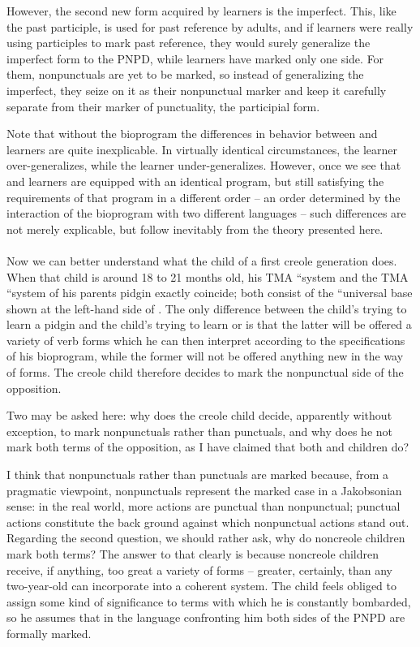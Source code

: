 However, the second new form acquired by  learners is the imperfect. This, like the past participle, is used for past reference by adults, and if  learners were really using participles to mark past reference, they would surely generalize the imperfect form to
the PNPD, while  learners have marked only one side. For them, nonpunctuals are yet to be marked, so instead of generalizing the imperfect, they seize on it as their nonpunctual marker and keep it carefully separate from their marker of punctuality, the participial form.

Note that without the bioprogram the differences in behavior between  and  learners are quite inexplicable. In virtually identical circumstances, the  learner over-generalizes, while the  learner under-generalizes. However, once we see that  and  learners are equipped with an identical program, but still satisfying the requirements of that program in a different order -- an order determined by the interaction of the bioprogram with two different languages -- such differences are not merely explicable, but follow inevitably from the theory presented here.\\\\

Now we can better understand what the child of a first creole generation does. When that child is around 18 to 21 months old, his TMA ``system and the TMA ``system of his parents pidgin exactly coincide; both consist of the ``universal base shown at the left-hand side of . The only difference between the child's trying to learn a pidgin and the child's trying to learn  or  is that the latter will be offered a variety of verb forms which he can then interpret according to the specifications of his bioprogram, while the former will not be offered anything new in the way of forms. The creole child therefore decides to mark the nonpunctual side of the opposition.

Two  may be asked here: why does the creole child decide, apparently without exception, to mark nonpunctuals rather than punctuals, and why does he not mark both terms of the opposition, as I have claimed that both  and  children do?

I think that nonpunctuals rather than punctuals are marked because, from a pragmatic viewpoint, nonpunctuals represent the marked case in a Jakobsonian sense: in the real world, more actions are punctual than nonpunctual; punctual actions constitute the back%
ground against which nonpunctual actions stand out. Regarding the second question, we should rather ask, why do noncreole children mark both terms? The answer to that clearly is because noncreole children receive, if anything, too great a variety of forms -- greater, certainly, than any two-year-old can incorporate into a coherent system. The child feels obliged to assign some kind of significance to terms with which he is constantly bombarded, so he assumes that in the language confronting him both sides of the PNPD are formally marked.

